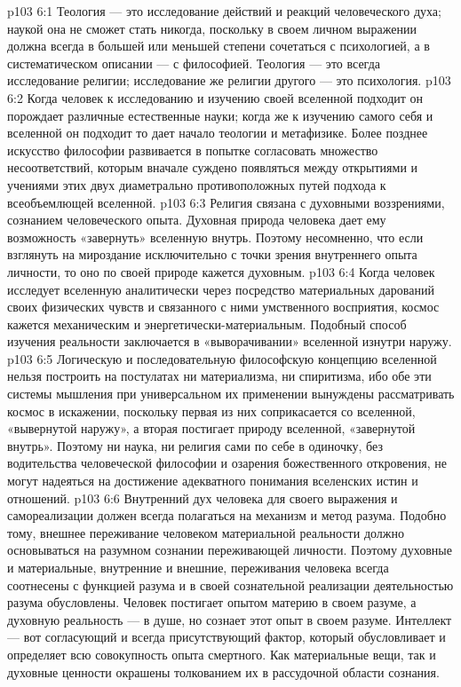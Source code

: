 \vs p103 6:1 Теология --- это исследование действий и реакций человеческого духа; наукой она не сможет стать никогда, поскольку в своем личном выражении должна всегда в большей или меньшей степени сочетаться с психологией, а в систематическом описании --- с философией. Теология --- это всегда исследование  религии; исследование же религии другого --- это психология.
\vs p103 6:2 \pc Когда человек к исследованию и изучению своей вселенной подходит  он порождает различные естественные науки; когда же к изучению самого себя и вселенной он подходит  то дает начало теологии и метафизике. Более позднее искусство философии развивается в попытке согласовать множество несоответствий, которым вначале суждено появляться между открытиями и учениями этих двух диаметрально противоположных путей подхода к всеобъемлющей вселенной.
\vs p103 6:3 Религия связана с духовными воззрениями, сознанием  человеческого опыта. Духовная природа человека дает ему возможность «завернуть» вселенную внутрь. Поэтому несомненно, что если взглянуть на мироздание исключительно с точки зрения внутреннего опыта личности, то оно по своей природе кажется духовным.
\vs p103 6:4 Когда человек исследует вселенную аналитически через посредство материальных дарований своих физических чувств и связанного с ними умственного восприятия, космос кажется механическим и энергетически\hyp{}материальным. Подобный способ изучения реальности заключается в «выворачивании» вселенной изнутри наружу.
\vs p103 6:5 \pc Логическую и последовательную философскую концепцию вселенной нельзя построить на постулатах ни материализма, ни спиритизма, ибо обе эти системы мышления при универсальном их применении вынуждены рассматривать космос в искажении, поскольку первая из них соприкасается со вселенной, «вывернутой наружу», а вторая постигает природу вселенной, «завернутой внутрь». Поэтому ни наука, ни религия сами по себе в одиночку, без водительства человеческой философии и озарения божественного откровения, не могут надеяться на достижение адекватного понимания вселенских истин и отношений.
\vs p103 6:6 Внутренний дух человека для своего выражения и самореализации должен всегда полагаться на механизм и метод разума. Подобно тому, внешнее переживание человеком материальной реальности должно основываться на разумном сознании переживающей личности. Поэтому духовные и материальные, внутренние и внешние, переживания человека всегда соотнесены с функцией разума и в своей сознательной реализации деятельностью разума обусловлены. Человек постигает опытом материю в своем разуме, а духовную реальность --- в душе, но сознает этот опыт в своем разуме. Интеллект --- вот согласующий и всегда присутствующий фактор, который обусловливает и определяет всю совокупность опыта смертного. Как материальные вещи, так и духовные ценности окрашены толкованием их в рассудочной области сознания.
